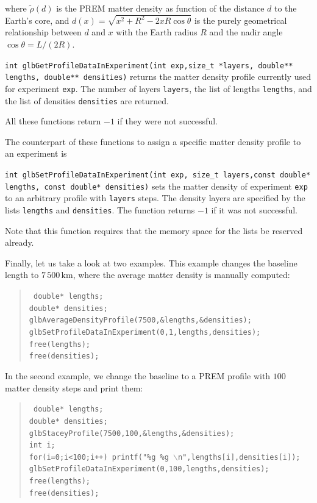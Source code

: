 \ee
where $\tilde{\rho}(d)$ is the PREM matter density as function of the
distance $d$ to the Earth's core, and $d(x)=\sqrt{x^2+R^2-2 x R \cos \theta }$ is the purely geometrical relationship between $d$ and $x$ with the
Earth radius $R$ and the nadir angle $\cos \theta = L/(2 R)$.
\begin{function}
{\tt int glbGetProfileDataInExperiment(int exp,size\_t *layers, double** lengths, double** densities)} returns the matter density profile 
currently used for experiment {\tt exp}. The number of layers {\tt layers}, the list of lengths {\tt lengths}, and the list of densities {\tt densities} are returned.
\end{function}
All these functions return $-1$ if they were not successful.

The counterpart of these functions to assign a specific matter density
profile to an experiment is
\begin{function}
{\tt int glbSetProfileDataInExperiment(int exp, size\_t layers,const double* lengths, const double* densities)} sets the matter density of experiment
{\tt exp} to an arbitrary profile with {\tt layers} steps. The density
layers are specified by the lists {\tt lengths} and {\tt densities}.
The function returns $-1$ if it was not successful.
\end{function}
Note that this function requires that the memory space for the lists
be reserved already.

Finally, let us take a look at two examples. This example changes
the baseline length to $7\,500 \, \mathrm{km}$, where the average 
matter density is manually computed:
\begin{quote}
{\tt  
  double* lengths; \\
  double* densities; \\
  glbAverageDensityProfile(7500,\&lengths,\&densities); \\
  glbSetProfileDataInExperiment(0,1,lengths,densities); \\
  free(lengths); \\
  free(densities); \\
}
\end{quote}
In the second example, we change the baseline to a PREM profile with
$100$ matter density steps and print them:
\begin{quote}
{\tt
  double* lengths; \\
  double* densities; \\
  glbStaceyProfile(7500,100,\&lengths,\&densities); \\
  int i; \\
  for(i=0;i<100;i++) printf("\%g \%g $\backslash$n",lengths[i],densities[i]); \\
  glbSetProfileDataInExperiment(0,100,lengths,densities); \\
  free(lengths);\\
  free(densities);\\
}
\end{quote}

